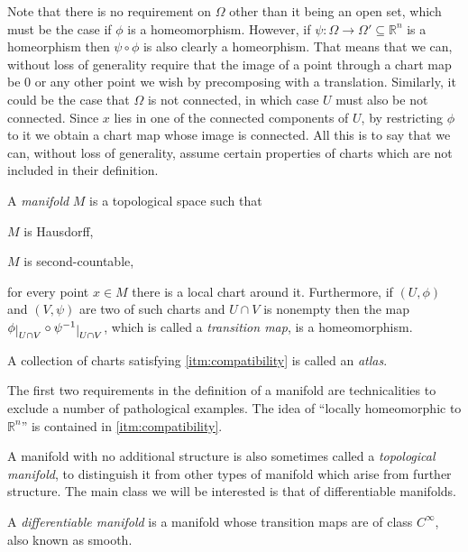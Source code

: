 \documentclass[12pt,oneside]{book}
\numberwithin{table}{section}
\numberwithin{equation}{section}
\numberwithin{figure}{section}
\newcommand{\rest}[1]{\raisebox{-.5ex}{$|$}_{#1}}
\newcommand{\R}{\mathbb{R}}
\begin{document}
Note that there is no requirement on \( \Omega \) other than it being an open set, which must be the case if \( \phi \) is a homeomorphism. However, if \( \psi \colon \Omega \to \Omega' \subseteq \R^n \) is a homeorphism then \( \psi \circ \phi \) is also clearly a homeorphism. That means that we can, without loss of generality require that the image of a point through a chart map be 0 or any other point we wish by precomposing with a translation. Similarly, it could be the case that \( \Omega \) is not connected, in which case \( U \) must also be not connected. Since \( x \) lies in one of the connected components of \( U \), by restricting \( \phi \) to it we obtain a chart map whose image is connected. All this is to say that we can, without loss of generality, assume certain properties of charts which are not included in their definition.

\begin{defn}[Manifold]
	A \emph{manifold} \( M \) is a topological space such that
	\begin{points}
	\item \( M \) is Hausdorff,
	\item \( M \) is second-countable,
	\item \label{itm:compatibility} for every point \( x \in M \) there is a local chart around it. Furthermore, if \( (U,\phi) \) and \( (V, \psi) \) are two of such charts and \( U \cap V \) is nonempty then the map \( \phi\rest{U \cap V} \circ \psi^{-1}\rest{U \cap V} \), which is called a \emph{transition map}, is a homeomorphism. 
	\end{points}
	A collection of charts satisfying \ref{itm:compatibility} is called an \emph{atlas}.
\end{defn}

The first two requirements in the definition of a manifold are technicalities to exclude a number of pathological examples. The idea of ``locally homeomorphic to \( \R^n \)'' is contained in \ref{itm:compatibility}.

A manifold with no additional structure is also sometimes called a \emph{topological manifold}, to distinguish it from other types of manifold which arise from further structure. The main class we will be interested is that of differentiable manifolds.

\begin{defn} A \emph{differentiable manifold} is a manifold whose transition maps are of class \( C^{\infty} \), also known as smooth.
\end{defn}
\end{document}
